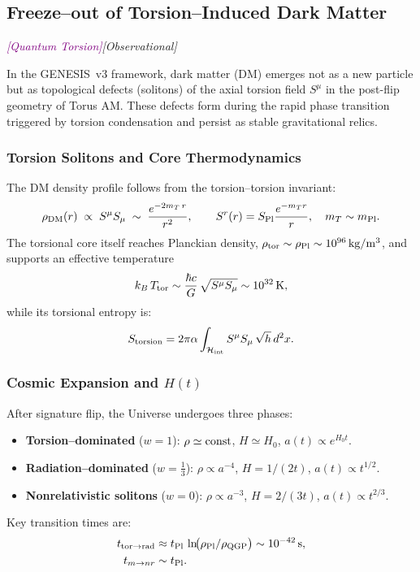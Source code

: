 \documentclass{article}
\newcommand{\Splanck}{\ensuremath{S_{\mathrm{Pl}}}}
\newcommand{\quantumtag}{\textcolor{purple}{\textit{[Quantum Torsion]}}}
\newcommand{\obstag}{\textcolor{green!60!black}{\textit{[Observational]}}}
\begin{document}
\subsection{Freeze--out of Torsion--Induced Dark Matter}
\label{subsec:torsion_freezeout}
\quantumtag  \obstag


In the GENESIS~v3 framework, dark matter (DM) emerges not as a new particle but as topological defects (solitons) of the axial torsion field $S^\mu$ in the post-flip geometry of Torus AM. These defects form during the rapid phase transition triggered by torsion condensation and persist as stable gravitational relics.

\subsubsection{Torsion Solitons and Core Thermodynamics}
The DM density profile follows from the torsion–torsion invariant:
\begin{equation}
  \rho_{\rm DM}(r)\;\propto\; S^\mu S_\mu
  \;\sim\;\frac{e^{-2m_T\,r}}{r^2},
  \qquad
  S^r(r) = \Splanck \frac{e^{-m_T r}}{r},\quad
  m_T \sim m_{\rm Pl}.
\end{equation}
The torsional core itself reaches Planckian density,
$\rho_{\rm tor}\sim\rho_{\rm Pl}\sim10^{96}\,\mathrm{kg/m^3}$, and supports an
effective temperature
\begin{equation}
  k_B\,T_{\rm tor}
  \sim \frac{\hbar c}{G}\,\sqrt{S^\mu S_\mu}
  \sim 10^{32}\,\mathrm{K},
\end{equation}
while its torsional entropy is:
\begin{equation}
  S_{\rm torsion}
  = 2\pi\alpha \int_{\mathcal H_{\rm int}} S^\mu S_\mu\, \sqrt{h}\,d^2x.
\end{equation}

\subsubsection{Cosmic Expansion and \(H(t)\)}
After signature flip, the Universe undergoes three phases:
\begin{itemize}
  \item {\bf Torsion–dominated} (\(w=1\)): 
    \(\rho\simeq\rm const\), \(H\simeq H_0\), \(a(t)\propto e^{H_0t}\).
  \item {\bf Radiation–dominated} (\(w=\tfrac13\)): 
    \(\rho\propto a^{-4}\), \(H=1/(2t)\), \(a(t)\propto t^{1/2}\).
  \item {\bf Nonrelativistic solitons} (\(w=0\)): 
    \(\rho\propto a^{-3}\), \(H=2/(3t)\), \(a(t)\propto t^{2/3}\).
\end{itemize}
Key transition times are:
\begin{align*}
  t_{\rm tor\to rad}
    &\approx t_{\rm Pl}\,\ln\!\bigl(\rho_{\rm Pl}/\rho_{\rm QGP}\bigr)
     \sim10^{-42}\,\mathrm s,\\
  t_{m\to nr}
    &\sim t_{\rm Pl}.
\end{align*}
\end{document}
